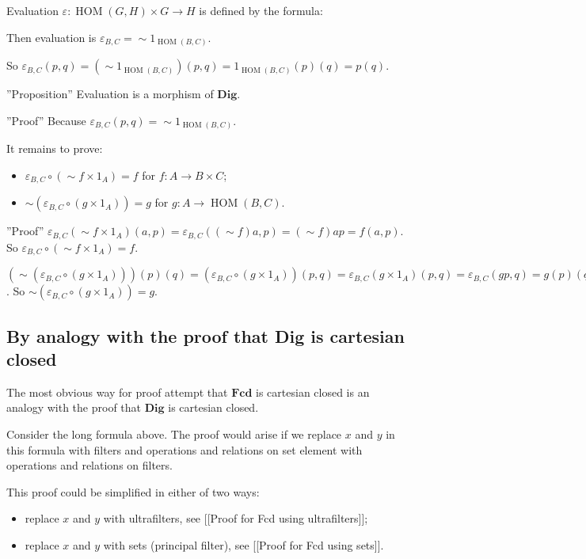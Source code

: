 Evaluation $\varepsilon : \operatorname{HOM} ( G , H) \times G \rightarrow H$ is defined by the formula:

Then evaluation is $\varepsilon_{B, C} = \mathop{\sim} 1_{\operatorname{HOM}(B,C)}$.

So $\varepsilon_{B, C} ( p , q) = ( \mathop{\sim} 1_{\operatorname{HOM}(B,C)}) ( p , q) = 1_{\operatorname{HOM}(B,C)} ( p) ( q) = p ( q)$.

''Proposition'' Evaluation is a morphism of $\mathbf{Dig}$.

''Proof'' Because $\varepsilon_{B, C} ( p , q) = \mathop{\sim} 1_{\operatorname{HOM}(B,C)}$.

It remains to prove:
\begin{itemize}
\item $\varepsilon_{B, C} \circ ( \sim f \times 1_{A}) = f$ for $f : A \rightarrow B \times C$;
\item $\sim ( \varepsilon_{B, C} \circ ( g \times 1_{A})) = g$ for $g : A \rightarrow \operatorname{HOM} ( B , C)$.
\end{itemize}

''Proof'' $\varepsilon_{B, C} ( \sim f \times 1_{A}) ( a , p) = \varepsilon_{B, C} ( ( \sim f) a , p) = ( \sim f) a p = f ( a , p)$. So $\varepsilon_{B, C} \circ ( \sim f \times 1_{A}) = f$.

  $(\sim ( \varepsilon_{B, C} \circ ( g \times 1_{A}))) ( p) ( q) = ( \varepsilon_{B, C} \circ ( g \times 1_{A})) ( p , q) = \varepsilon_{B, C} ( g \times 1_{A}) ( p , q) = \varepsilon_{B, C} ( g p , q) = g ( p) ( q)$. So $\sim ( \varepsilon_{B, C} \circ ( g \times 1_{A})) = g$.

\subsection{By analogy with the proof that Dig is cartesian closed}

The most obvious way for proof attempt that $\mathbf{Fcd}$ is cartesian closed is an analogy with the proof that
$\mathbf{Dig}$ is cartesian closed.

Consider the long formula above. The proof would arise if we replace $x$ and $y$ in this formula with filters and operations and relations on set element with operations and relations on filters.

This proof could be simplified in either of two ways:
\begin{itemize}
\item replace $x$ and $y$ with ultrafilters, see [[Proof for Fcd using ultrafilters]];
\item replace $x$ and $y$ with sets (principal filter), see [[Proof for Fcd using sets]].
\end{itemize}

